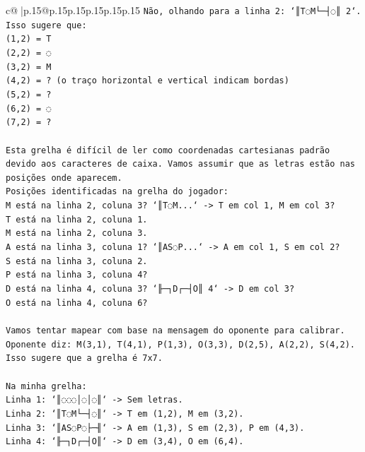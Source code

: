 \documentclass{article}
\begin{document}
{\begin{supertabular}{c@{$\;$}|p{.15\linewidth}@{}p{.15\linewidth}p{.15\linewidth}p{.15\linewidth}p{.15\linewidth}p{.15\linewidth}}
{{{\texttt{Não, olhando para a linha 2: `║T◌M└─┤◌║ 2`.} \\
\texttt{Isso sugere que:} \\
\texttt{(1,2) = T} \\
\texttt{(2,2) = ◌} \\
\texttt{(3,2) = M} \\
\texttt{(4,2) = ? (o traço horizontal e vertical indicam bordas)} \\
\texttt{(5,2) = ?} \\
\texttt{(6,2) = ◌} \\
\texttt{(7,2) = ?} \\
\\ 
\texttt{Esta grelha é difícil de ler como coordenadas cartesianas padrão devido aos caracteres de caixa. Vamos assumir que as letras estão nas posições onde aparecem.} \\
\texttt{Posições identificadas na grelha do jogador:} \\
\texttt{M está na linha 2, coluna 3? `║T◌M...` {-}> T em col 1, M em col 3?} \\
\texttt{T está na linha 2, coluna 1.} \\
\texttt{M está na linha 2, coluna 3.} \\
\texttt{A está na linha 3, coluna 1? `║AS◌P...` {-}> A em col 1, S em col 2?} \\
\texttt{S está na linha 3, coluna 2.} \\
\texttt{P está na linha 3, coluna 4?} \\
\texttt{D está na linha 4, coluna 3? `╟─┐D┌─┤O║ 4` {-}> D em col 3?} \\
\texttt{O está na linha 4, coluna 6?} \\
\\ 
\texttt{Vamos tentar mapear com base na mensagem do oponente para calibrar.} \\
\texttt{Oponente diz: M(3,1), T(4,1), P(1,3), O(3,3), D(2,5), A(2,2), S(4,2).} \\
\texttt{Isso sugere que a grelha é 7x7.} \\
\\ 
\texttt{Na minha grelha:} \\
\texttt{Linha 1: `║◌◌◌│◌│◌║` {-}> Sem letras.} \\
\texttt{Linha 2: `║T◌M└─┤◌║` {-}> T em (1,2), M em (3,2).} \\
\texttt{Linha 3: `║AS◌P◌├─╢` {-}> A em (1,3), S em (2,3), P em (4,3).} \\
\texttt{Linha 4: `╟─┐D┌─┤O║` {-}> D em (3,4), O em (6,4).} \\
}}}
\end{supertabular}}
\end{document}
